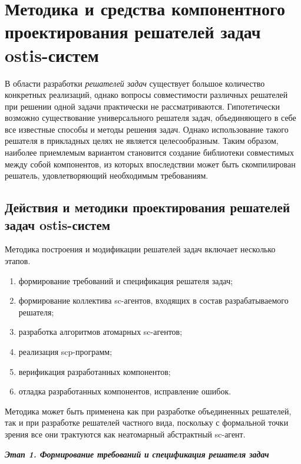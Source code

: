 \chapter{Методика и средства компонентного проектирования решателей задач ostis-систем}
\label{chapter_ps_design}


В области разработки \textit{решателей задач} существует большое количество конкретных реализаций, однако вопросы совместимости различных решателей при решении одной задачи практически не рассматриваются. Гипотетически возможно существование универсального решателя задач, объединяющего в себе все известные способы и методы решения задач. Однако использование такого решателя в прикладных целях не является целесообразным. Таким образом, наиболее приемлемым вариантом становится создание библиотеки совместимых между собой компонентов, из которых впоследствии может быть скомпилирован решатель, удовлетворяющий необходимым требованиям.

\section{Действия и методики проектирования решателей задач ostis-систем}

Методика построения и модификации решателей задач включает несколько этапов. 
\begin{enumerate}
    \item формирование требований и спецификация решателя задач;
    \item формирование коллектива sc-агентов, входящих в состав разрабатываемого решателя;
    \item разработка алгоритмов атомарных sc-агентов;
    \item реализация scp-программ;
    \item верификация разработанных компонентов;
    \item отладка разработанных компонентов, исправление ошибок.
\end{enumerate}

Методика может быть применена как при разработке объединенных решателей, так и при разработке решателей частного вида, поскольку с формальной точки зрения все они трактуются как неатомарный абстрактный sc-агент.

\textbf{\textit{Этап 1. Формирование требований и спецификация  решателя задач}}


